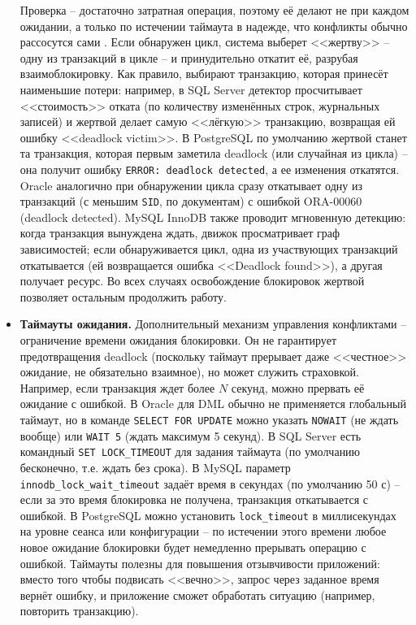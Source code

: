 \begin{itemize}
    Проверка – достаточно затратная операция, поэтому её делают не при каждом ожидании, а только по истечении таймаута в надежде, что конфликты обычно рассосутся сами \autocite{PostgreSQLdocc19}. Если обнаружен цикл, система выберет <<жертву>> – одну из транзакций в цикле – и принудительно откатит её, разрубая взаимоблокировку. Как правило, выбирают транзакцию, которая принесёт наименьшие потери: например, в SQL Server детектор просчитывает <<стоимость>> отката (по количеству изменённых строк, журнальных записей) и жертвой делает самую <<лёгкую>> транзакцию, возвращая ей ошибку <<deadlock victim>>. В PostgreSQL по умолчанию жертвой станет та транзакция, которая первым заметила deadlock (или случайная из цикла) – она получит ошибку \texttt{ERROR: deadlock detected}, а ее изменения откатятся. Oracle аналогично при обнаружении цикла сразу откатывает одну из транзакций (с меньшим \texttt{SID}, по документам) с ошибкой ORA-00060 (deadlock detected). MySQL InnoDB также проводит мгновенную детекцию: когда транзакция вынуждена ждать, движок просматривает граф зависимостей; если обнаруживается цикл, одна из участвующих транзакций откатывается (ей возвращается ошибка <<Deadlock found>>), а другая получает ресурс. Во всех случаях освобождение блокировок жертвой позволяет остальным продолжить работу. \item \textbf{Таймауты ожидания.} Дополнительный механизм управления конфликтами – ограничение времени ожидания блокировки. Он не гарантирует предотвращения deadlock (поскольку таймаут прерывает даже <<честное>> ожидание, не обязательно взаимное), но может служить страховкой. Например, если транзакция ждет более $N$ секунд, можно прервать её ожидание с ошибкой. В Oracle для DML обычно не применяется глобальный таймаут, но в команде \texttt{SELECT FOR UPDATE} можно указать \texttt{NOWAIT} (не ждать вообще) или \texttt{WAIT 5} (ждать максимум 5 секунд). В SQL Server есть командный \texttt{SET LOCK\_TIMEOUT} для задания таймаута (по умолчанию бесконечно, т.е. ждать без срока). В MySQL параметр \texttt{innodb\_lock\_wait\_timeout} задаёт время в секундах (по умолчанию 50 с) – если за это время блокировка не получена, транзакция откатывается с ошибкой. В PostgreSQL можно установить \texttt{lock\_timeout} в миллисекундах на уровне сеанса или конфигурации – по истечении этого времени любое новое ожидание блокировки будет немедленно прерывать операцию с ошибкой. Таймауты полезны для повышения отзывчивости приложений: вместо того чтобы подвисать <<вечно>>, запрос через заданное время вернёт ошибку, и приложение сможет обработать ситуацию (например, повторить транзакцию). 

\end{itemize}
